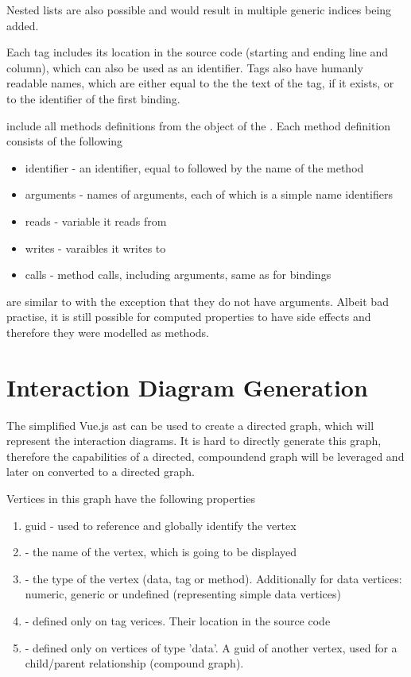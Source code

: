 Nested lists are also possible and would result in multiple generic indices being added.

Each tag includes its location in the source code (starting and ending line and column), which can also be used as an identifier. Tags also have humanly readable names, which are either equal to the the text of the tag, if it exists, or to the identifier of the first binding. 

 include all methods definitions from the  object of the . Each method definition consists of the following
\begin{itemize}
    \item identifier - an identifier, equal to  followed by the name of the method
    \item arguments - names of arguments, each of which is a simple name identifiers
    \item reads - variable it reads from
    \item writes - varaibles it writes to
    \item calls - method calls, including arguments, same as for bindings 
\end{itemize}

 are similar to  with the exception that they do not have arguments. Albeit bad practise, it is still possible for computed properties to have side effects and therefore they were modelled as methods.

\section{Interaction Diagram Generation}

The simplified Vue.js \gls{ast} can be used to create a directed graph, which will represent the interaction diagrams. It is hard to directly generate this graph, therefore the capabilities of a directed, compoundend graph will be leveraged and later on converted to a directed graph. 

Vertices in this graph have the following properties
\label{concept:interaction_diagram_structure}
\begin{enumerate}
    \item \gls{guid} - used to reference and globally identify the vertex 
    \item {} - the name of the vertex, which is going to be displayed
    \item {} - the type of the vertex (data, tag or method). Additionally for data vertices: numeric, generic or undefined (representing simple data vertices)
    \item {} - defined only on tag verices. Their location in the source code
    \item {} - defined only on vertices of type 'data'. A \gls{guid} of another vertex, used for a child/parent relationship (compound graph).
\end{enumerate}

